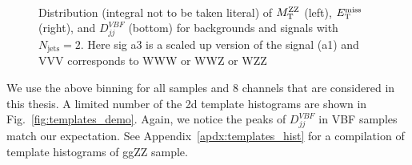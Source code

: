 \begin{figure}[htb]
\begin{center}
\\
\end{center}
\caption{Distribution (integral not to be taken literal) of $M_\mathrm{T}^{\mathrm{ZZ}}$ (left), $E_{\mathrm{T}}^{\mathrm{miss}}$ (right), and
    $D_{j j}^{V B F}$ (bottom) for backgrounds and signals with
$N_\mathrm{jets}=2$. Here sig a3 is a scaled up version of the signal (a1) and VVV corresponds to
WWW or WWZ or WZZ}
\label{fig:1d_hists_all}
\end{figure}

We use the above binning for all samples and 8 channels that are considered in this
thesis. A limited number of the 2d template histograms are
shown in Fig.~\ref{fig:templates_demo}. Again, we notice the peaks of $D_{j j}^{V B F}$ in
VBF samples match our expectation.
See Appendix~\ref{apdx:templates_hist} for a compilation of template histograms of ggZZ sample.


